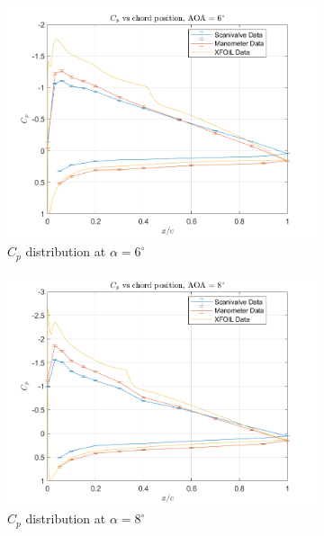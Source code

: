 \documentclass[runningheads]{llncs}
\begin{document}
\begin{figure}[H]
\begin{subfigure}[b]{0.3\textwidth}
        \centering
        \includegraphics[width=\textwidth]{figures/AOA6.png}
        \caption{$C_p$ distribution at $\alpha = 6^\circ$}
        \label{fig:cp_6}
    \end{subfigure}
    \begin{subfigure}[b]{0.3\textwidth}
        \centering
        \includegraphics[width=\textwidth]{figures/AOA8.png}
        \caption{$C_p$ distribution at $\alpha = 8^\circ$}
        \label{fig:cp_8}
    \end{subfigure}
    \begin{subfigure}[b]{0.3\textwidth}
        \centering

\end{subfigure}
\end{figure}
\end{document}
